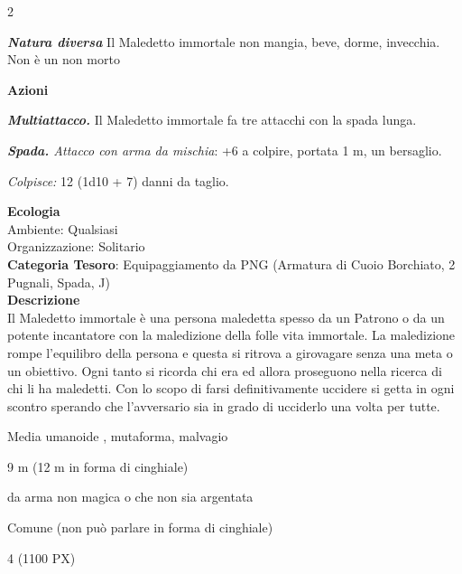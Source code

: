 \begin{multicols}{2}
{\emph{\textbf{Natura diversa}} Il Maledetto immortale non mangia, beve, dorme, invecchia. Non è un non morto

\textbf{Azioni}

\emph{\textbf{Multiattacco.}} Il Maledetto immortale fa tre attacchi con la spada lunga.

\emph{\textbf{Spada.} Attacco con arma da mischia}: +6 a colpire, portata 1 m, un bersaglio.

\emph{Colpisce:} 12 (1d10 + 7) danni da taglio.

\textbf{Ecologia}\\
Ambiente: Qualsiasi\\
Organizzazione: Solitario\\
\textbf{Categoria Tesoro}: Equipaggiamento da PNG (Armatura di Cuoio Borchiato, 2 Pugnali, Spada, J)\\
\textbf{Descrizione}\\
Il Maledetto immortale è una persona maledetta spesso da un Patrono o da un potente incantatore con la maledizione della folle vita immortale. La maledizione rompe l'equilibro della persona e questa si ritrova a girovagare senza una meta o un obiettivo. Ogni tanto si ricorda chi era ed allora proseguono nella ricerca di chi li ha maledetti.
Con lo scopo di farsi definitivamente uccidere si getta in ogni scontro sperando che l'avversario sia in grado di ucciderlo una volta per tutte.

\label{cinghialemannaro}
\begin{description}[noitemsep, topsep=0pt, parsep=0pt, partopsep=0pt, itemsep=1pt, leftmargin=2.35cm,  labelwidth=2.2cm, itemindent=0cm, listparindent=0pt] %
\setlength{\baselineskip}{10pt}
\item[\textbf{Taglia/Tipo}] Media umanoide , mutaforma, malvagio
\item[\textbf{Caratt.}] 
\item[\textbf{Punti Ferita}] 
\item[\textbf{Movimento}] 9 m (12 m in forma di cinghiale)
\item[\textbf{Tiri Salvez.}] 
\item[\textbf{Imm. Danni}] da arma non magica o che non sia argentata
\item[\textbf{Linguaggi}] Comune (non può parlare in forma di cinghiale)
\item[\textbf{Sfida}] 4 (1100 PX)
\end{description}
\smallskip

}
\end{multicols}
